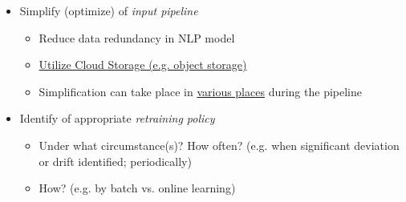 \documentclass[10pt,landscape,letterpaper]{cheatsheet}
\begin{document}
\begin{multicols}{3}
\begin{itemize}
    \item Simplify (optimize) of \emph{input pipeline}
    \begin{itemize}
        \item Reduce data redundancy in NLP model
        \item \href{https://blog.westerndigital.com/machine-learning-pipeline-object-storage/}{Utilize Cloud Storage (e.g. object storage)}
        \item Simplification can take place in \href{https://towardsdatascience.com/simplify-machine-learning-workflows-e9d4f404aaeb}{various places} during the pipeline
    \end{itemize}
    \item Identify of appropriate \emph{retraining policy} %
    \begin{itemize}
        \item Under what circumstance(s)? How often? (e.g. when significant deviation or drift identified; periodically)
        \item How? (e.g. by batch vs. online learning)
    \end{itemize}
\end{itemize}

\end{multicols}
\end{document}
